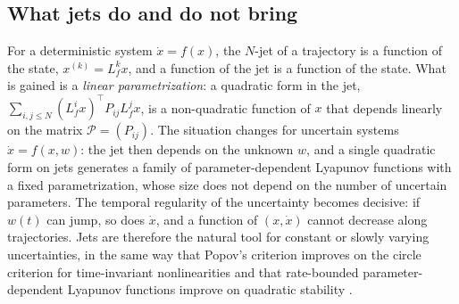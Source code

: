 \documentclass[preprint,12pt,authoryear]{elsarticle}
\theoremstyle{definition}
\theoremstyle{remark}
\newcommand{\tr}{^{\top}}
\newcommand{\PP}{\mathcal{P}}
\begin{document}
\subsection{What jets do and do not bring}
For a deterministic system $\dot x=f(x)$, the $N$-jet of a trajectory is a function of the state, $x^{(k)}=L_f^kx$, and a function of the jet is a function of the state. What is gained is a \emph{linear parametrization}: a quadratic form in the jet, $\sum_{i,j\le N}(L_f^ix)\tr P_{ij}L_f^jx$, is a non-quadratic function of $x$ that depends linearly on the matrix $\PP=(P_{ij})$. The situation changes for uncertain systems $\dot x=f(x,w)$: the jet then depends on the unknown $w$, and a single quadratic form on jets generates a family of parameter-dependent Lyapunov functions with a fixed parametrization, whose size does not depend on the number of uncertain parameters. The temporal regularity of the uncertainty becomes decisive: if $w(t)$ can jump, so does $\dot x$, and a function of $(x,\dot x)$ cannot decrease along trajectories. Jets are therefore the natural tool for constant or slowly varying uncertainties, in the same way that Popov's criterion improves on the circle criterion for time-invariant nonlinearities and that rate-bounded parameter-dependent Lyapunov functions improve on quadratic stability \citep{Gahinet1996}.
\end{document}
